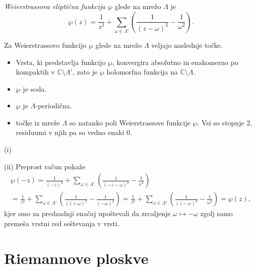 \documentclass[mat1]{fmfdelo}
\newcommand{\C}{\mathbb C}
\newcommand{\om}{\omega}
\theoremstyle{definition}
\begin{document}
\begin{definicija}
    \emph{Weierstrassova eliptična funkcija $\wp$} glede na mrežo $\Lambda$ je
    \[
        \wp(z) = \frac{1}{z^2} + \sum_{\om\in\Lambda'}\left(\frac{1}{(z-\om)^2} - \frac{1}{\om^2}\right).
    \]
\end{definicija}

\begin{trditev}
    Za Weierstrassovo funkcijo $\wp$ glede na mrežo $\Lambda$ veljajo naslednje točke.
    \begin{itemize}
        \item[(i)] Vrsta, ki predstavlja funkcijo $\wp$, konvergira absolutno in enakomerno po kompaktih v $\C\setminus\Lambda'$, zato je $\wp$ holomorfna funkcija na $\C \setminus \Lambda$.
        \item[(ii)] $\wp$ je soda.
        \item[(iii)] $\wp$ je $\Lambda$-periodična.
        \item[(iv)] točke iz mreže $\Lambda$ so natanko poli Weierstrassove funkcije $\wp$. Vsi so stopnje $2$, residuumi v njih pa so vedno enaki $0$. 
    \end{itemize}
\end{trditev}

\begin{dokaz}
    (i)

    (ii) Preprost račun pokaže
    \begin{multline*}
        \wp(-z) =   
        \frac{1}{(-z)^2} + \sum_{\om\in\Lambda'}\left(\frac{1}{(-z-\om)^2} - \frac{1}{\om^2}\right) \\ = 
        \frac{1}{z^2} + \sum_{\om\in\Lambda'}\left(\frac{1}{(z+\om)^2} - \frac{1}{(-\om)^2}\right) =
        \frac{1}{z^2} + \sum_{\om\in\Lambda'}\left(\frac{1}{(z-\om)^2} - \frac{1}{\om^2}\right) =
        \wp(z),
    \end{multline*}
    kjer smo za predzadnji enačaj upoštevali da zrcaljenje $\omega \mapsto -\omega$ zgolj samo premeša vrstni red seštevanja v vrsti.
\end{dokaz}

\break





\section{Riemannove ploskve} \label{riemannove ploskve}
\end{document}
